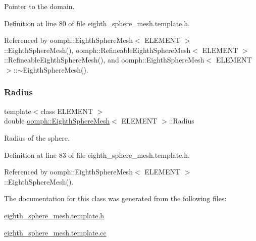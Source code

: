 Pointer to the domain. 



Definition at line 80 of file eighth\+\_\+sphere\+\_\+mesh.\+template.\+h.



Referenced by oomph\+::\+Eighth\+Sphere\+Mesh$<$ E\+L\+E\+M\+E\+N\+T $>$\+::\+Eighth\+Sphere\+Mesh(), oomph\+::\+Refineable\+Eighth\+Sphere\+Mesh$<$ E\+L\+E\+M\+E\+N\+T $>$\+::\+Refineable\+Eighth\+Sphere\+Mesh(), and oomph\+::\+Eighth\+Sphere\+Mesh$<$ E\+L\+E\+M\+E\+N\+T $>$\+::$\sim$\+Eighth\+Sphere\+Mesh().

\mbox{\label{classoomph_1_1EighthSphereMesh_a6dbcd3a6d27416a0d9ef25cc631f6043}} 
\subsubsection{\texorpdfstring{Radius}{Radius}}
{\footnotesize\ttfamily template$<$class E\+L\+E\+M\+E\+NT $>$ \\
double \hyperlink{classoomph_1_1EighthSphereMesh}{oomph\+::\+Eighth\+Sphere\+Mesh}$<$ E\+L\+E\+M\+E\+NT $>$\+::Radius\hspace{0.3cm}{\ttfamily [protected]}}



Radius of the sphere. 



Definition at line 83 of file eighth\+\_\+sphere\+\_\+mesh.\+template.\+h.



Referenced by oomph\+::\+Eighth\+Sphere\+Mesh$<$ E\+L\+E\+M\+E\+N\+T $>$\+::\+Eighth\+Sphere\+Mesh().



The documentation for this class was generated from the following files\+:\begin{DoxyCompactItemize}
\item 
\hyperlink{eighth__sphere__mesh_8template_8h}{eighth\+\_\+sphere\+\_\+mesh.\+template.\+h}\item 
\hyperlink{eighth__sphere__mesh_8template_8cc}{eighth\+\_\+sphere\+\_\+mesh.\+template.\+cc}\end{DoxyCompactItemize}
